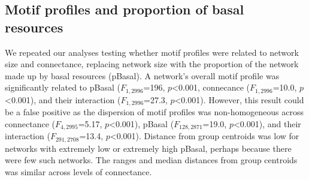 \documentclass[12pt]{article}
\begin{document}
\begin{spacing}{2.0}
        
    
    
    

    \subsection*{Motif profiles and proportion of basal resources}
    
        We repeated our analyses testing whether motif profiles were related to network size and connectance, replacing network size with the proportion of the network made up by basal resources (pBasal).
        A network's overall motif profile was significantly related to pBasal ($F_{1,2996}$=196, $p$\textless0.001, connecance ($F_{1,2996}$=10.0, $p$\textless0.001), and their interaction ($F_{1,2996}$=27.3, $p$\textless0.001).
        However, this result could be a false positive as the dispersion of motif profiles was non-homogeneous across connectance ($F_{4,2995}$=5.17, $p$\textless0.001), pBasal ($F_{128,2871}$=19.0, $p$\textless0.001), and their interaction ($F_{291,2708}$=13.4, $p$\textless0.001).
        Distance from group centroids was low for networks with extremely low or extremely high pBasal, perhaps because there were few such networks.
        The ranges and median distances from group centroids was similar across levels of connectance.
        

\end{spacing}
\end{document}
